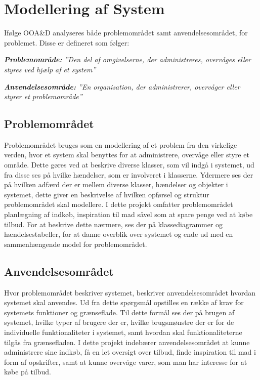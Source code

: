 \section{Modellering af System}
Ifølge OOA\&D\cite[s. 6]{OOA&D2001} analyseres både problemområdet samt anvendelsesområdet, for problemet.
Disse er defineret som følger:

\textit{\textbf{Problemområde:} ''Den del af omgivelserne, der administreres, overvåges eller styres ved hjælp af et system''}

\textit{\textbf{Anvendelsesområde:} ''En organisation, der administrerer, overvåger eller styrer et problemområde''}

\subsection{Problemområdet}
Problemområdet bruges som en modellering af et problem fra den virkelige verden, hvor et system skal benyttes for at administrere, overvåge eller styre et område. 
Dette gøres ved at beskrive diverse klasser, som vil indgå i systemet, ud fra disse ses på hvilke hændelser, som er involveret i klasserne.
Ydermere ses der på hvilken adfærd der er mellem diverse klasser, hændelser og objekter i systemet, dette giver en beskrivelse af hvilken opførsel og struktur problemområdet skal modellere.
I dette projekt omfatter problemområdet planlægning af indkøb, inspiration til mad såvel som at spare penge ved at købe tilbud.
For at beskrive dette nærmere, ses der på klassediagrammer og hændelsestabeller, for at danne overblik over systemet og ende ud med en sammenhængende model for problemområdet.
\subsection{Anvendelsesområdet}
Hvor problemområdet beskriver systemet, beskriver anvendelsesområdet hvordan systemet skal anvendes.
Ud fra dette spørgsmål opstilles en række af krav for systemets funktioner og grænseflade.
Til dette formål ses der på brugen af systemet, hvilke typer af brugere der er, hvilke brugsmønstre der er for de individuelle funktionaliteter i systemet, samt hvordan skal funktionaliteterne tilgås fra grænsefladen.
I dette projekt indebærer anvendelsesområdet at kunne administrere sine indkøb, få en let oversigt over tilbud, finde inspiration til mad i form af opskrifter, samt at kunne overvåge varer, som man har interesse for at købe på tilbud.

